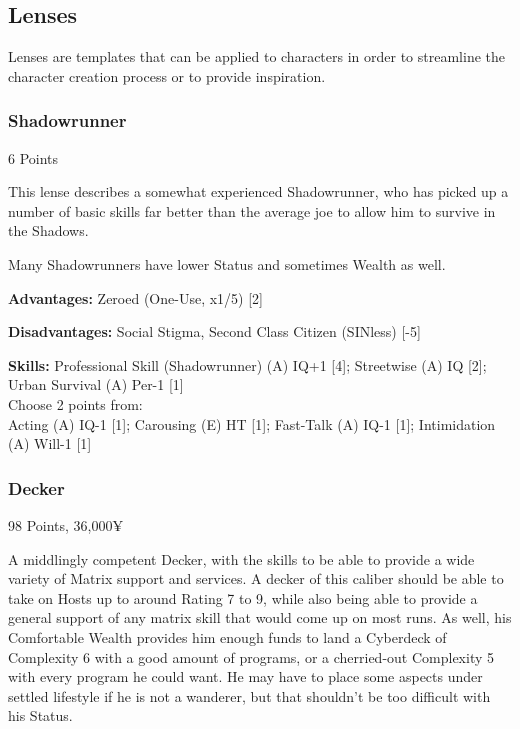 \begin{multicols*}{2}
	
	\subsection{Lenses}
	
	Lenses are templates that can be applied to characters in order to streamline the character creation process or to provide inspiration.
	
	\subsubsection{Shadowrunner}
	\begin{flushright}
		6 Points
	\end{flushright}
	
	This lense describes a somewhat experienced Shadowrunner, who has picked up a number of basic skills far better than the average joe to allow him to survive in the Shadows.
	
	Many Shadowrunners have lower Status and sometimes Wealth as well.
	
	
	\textbf{Advantages:}
	Zeroed (One-Use, x1/5) [2]
	
	\textbf{Disadvantages:}
	Social Stigma, Second Class Citizen (SINless) [-5]
	
	\textbf{Skills:}
	Professional Skill (Shadowrunner) (A) IQ+1 [4]; Streetwise (A) IQ [2]; Urban Survival (A) Per-1 [1]\\
	Choose 2 points from:\\
	Acting (A) IQ-1 [1]; Carousing (E) HT [1]; Fast-Talk (A) IQ-1 [1]; Intimidation (A) Will-1 [1]
	
	\subsubsection{Decker}
	\begin{flushright}
		98 Points, 36,000¥
	\end{flushright}
	
	A middlingly competent Decker, with the skills to be able to provide a wide variety of Matrix support and services. A decker of this caliber should be able to take on Hosts up to around Rating 7 to 9, while also being able to provide a general support of any matrix skill that would come up on most runs. As well, his Comfortable Wealth provides him enough funds to land a Cyberdeck of Complexity 6 with a good amount of programs, or a cherried-out Complexity 5 with every program he could want. He may have to place some aspects under settled lifestyle if he is not a wanderer, but that shouldn't be too difficult with his Status.
	

\end{multicols*}
